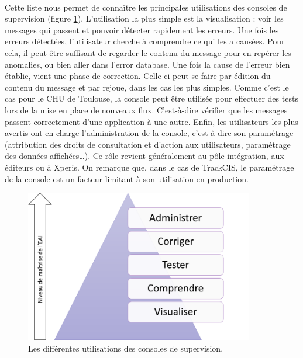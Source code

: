 			\paragraph{}
			Cette liste nous permet de connaître les principales utilisations des
			consoles de supervision (figure \ref{usage_consoles}). L’utilisation la plus
			simple est la visualisation : voir les messages qui passent et pouvoir détecter rapidement
			les erreurs. Une fois les erreurs détectées, l’utilisateur cherche à
			comprendre ce qui les a causées. Pour cela, il peut être suffisant de
			regarder le contenu du message pour en repérer les anomalies, ou bien aller
			dans l’error database. Une fois la cause de l’erreur bien établie, vient une
			phase de correction. Celle-ci peut se faire par édition du contenu du
			message et par rejoue, dans les cas les plus simples. Comme c’est le cas
			pour le CHU de Toulouse, la console peut être utilisée pour effectuer des
			tests lors de la mise en place de nouveaux flux. C’est-à-dire vérifier que
			les messages passent correctement d’une application à une autre. Enfin, les
			utilisateurs les plus avertis ont en charge l’administration de la console,
			c’est-à-dire son paramétrage (attribution des droits de consultation et
			d’action aux utilisateurs, paramétrage des données affichées\ldots). Ce rôle
			revient généralement au pôle intégration, aux éditeurs ou à Xperis. On
			remarque que, dans le cas de TrackCIS, le paramétrage de la console est un
			facteur limitant à son utilisation en production.
			\begin{figure}[H]%
				\centering
				\includegraphics[width=10cm]{../img/usage_1.png}
				\caption{\label{usage_consoles} Les différentes utilisations des consoles
				de supervision.}
			\end{figure}
			
